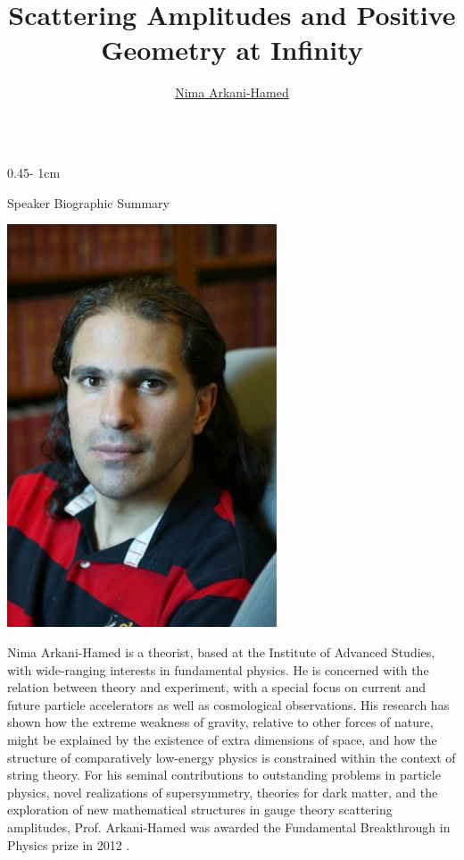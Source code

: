 \documentclass{psuposter}
\title{Scattering Amplitudes and Positive Geometry at Infinity}
\author
{\href{http://www.ias.edu/scholars/arkani-hamed}{Nima Arkani-Hamed}\inst{1}}
\institute
{
    \inst{1} Institute for Advanced Study, School of Natural Sciences
}
\begin{document}
\begin{frame}
\begin{columns}[onlytextwidth]


\begin{column}{0.45\textwidth - 1cm}
    \begin{block}{Speaker Biographic Summary}
    	\begin{center}
	    	\includegraphics[width=0.6\textwidth]{psuposter-images/arkani-hamed}    		
    	\end{center}
    	Nima Arkani-Hamed is a theorist, based at the Institute of Advanced Studies, with wide-ranging interests in fundamental physics.  He is concerned with the relation between theory and experiment, with a special focus on current and future particle accelerators as well as cosmological observations. His research has shown how the extreme weakness of gravity, relative to other forces of nature, might be explained by the existence of extra dimensions of space, and how the structure of comparatively low-energy physics is constrained within the context of string theory. 
For his seminal contributions to outstanding problems in particle physics, novel realizations of supersymmetry, theories for dark matter, and the exploration of new mathematical structures in gauge theory scattering amplitudes, Prof. Arkani-Hamed was awarded the Fundamental Breakthrough in Physics prize in 2012 \cite{NimaArkaniHamed}. 

\end{block}
\end{column}
\end{columns}
\end{frame}
\end{document}
